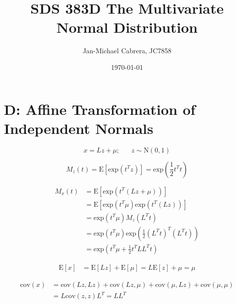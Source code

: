 \documentclass[12pt]{article}
\newcommand{\cov}{\text{cov}}
\newcommand{\E}{\text{E}}
\begin{document}
    \title{SDS 383D The Multivariate Normal Distribution}
    \author{Jan-Michael Cabrera, JC7858}
    \date{\today}
    \maketitle

    \section*{D: Affine Transformation of Independent Normals}

        \begin{equation}
            x = L z + \mu; \hspace{20pt} z \sim \text{N}(0,1)
        \end{equation}

        \begin{equation}
            M_z(t) =\E[\text{exp}(t^T z)] = \text{exp}\left( \frac{1}{2} t^T t\right)
        \end{equation}

        \begin{align}
            M_x(t) &= \E[\text{exp}(t^T (Lz + \mu))] \\
            &= \E[ \text{exp}(t^T \mu) \text{exp}(t^T(Lz))] \\
            &= \text{exp}(t^T \mu) M_z(L^T t) \\
            &= \text{exp}(t^T \mu) \text{exp}\left( \frac{1}{2} (L^T t)^T (L^T t)\right) \\
            &= \text{exp}\left ( t^T \mu + \frac{1}{2} t^T L L^T t\right)
        \end{align}

        \begin{align}
            \E [x] &= \E[Lz] + \E[\mu] = L \E[z] + \mu = \mu
        \end{align}

        \begin{align}
            \cov(x) &= \cov(Lz, Lz) + \cov(Lz, \mu) + \cov(\mu, Lz) + \cov(\mu, \mu) \\
            & = L \cov(z, z) L^T = L L^T
        \end{align}
\end{document}
